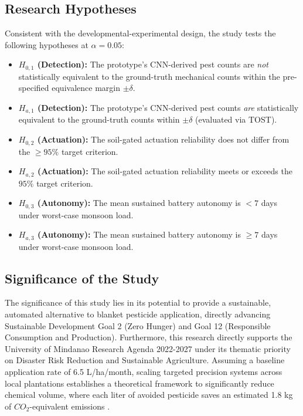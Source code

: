 \documentclass[conference]{IEEEtran}
\begin{document}
\subsection{Research Hypotheses}
Consistent with the developmental-experimental design, the study tests the following hypotheses at $\alpha = 0.05$:
\begin{itemize}
    \item \textbf{$H_{0,1}$ (Detection):} The prototype's CNN-derived pest counts are \emph{not} statistically equivalent to the ground-truth mechanical counts within the pre-specified equivalence margin $\pm\delta$.
    \item \textbf{$H_{a,1}$ (Detection):} The prototype's CNN-derived pest counts \emph{are} statistically equivalent to the ground-truth counts within $\pm\delta$ (evaluated via TOST).
    \item \textbf{$H_{0,2}$ (Actuation):} The soil-gated actuation reliability does not differ from the $\geq 95\%$ target criterion.
    \item \textbf{$H_{a,2}$ (Actuation):} The soil-gated actuation reliability meets or exceeds the $95\%$ target criterion.
    \item \textbf{$H_{0,3}$ (Autonomy):} The mean sustained battery autonomy is $< 7$ days under worst-case monsoon load.
    \item \textbf{$H_{a,3}$ (Autonomy):} The mean sustained battery autonomy is $\geq 7$ days under worst-case monsoon load.
\end{itemize}

\subsection{Significance of the Study}
The significance of this study lies in its potential to provide a sustainable, automated alternative to blanket pesticide application, directly advancing Sustainable Development Goal 2 (Zero Hunger) and Goal 12 (Responsible Consumption and Production). Furthermore, this research directly supports the University of Mindanao Research Agenda 2022-2027 under its thematic priority on Disaster Risk Reduction and Sustainable Agriculture. Assuming a baseline application rate of 6.5 L/ha/month, scaling targeted precision systems across local plantations establishes a theoretical framework to significantly reduce chemical volume, where each liter of avoided pesticide saves an estimated 1.8 kg of $CO_2$-equivalent emissions \cite{demandar2026}.
\end{document}
